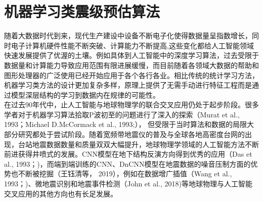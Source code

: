 
\chapter{机器学习类震级预估算法}
\indent 随着大数据时代到来，现代生产建设中设备不断电子化使得数据量呈指数增长，同时电子计算机硬件性能不断突破、计算能力不断提高,这些变化都给人工智能领域快速发展提供了优渥的土壤。例如具体到人工智能中的深度学习算法，过去受限于数据量和计算能力导致应用范围有限进展缓慢，而目前随着各领域大数据的帮助和图形处理器的广泛使用已经开始应用于各个各行各业。相比传统的统计学习方法，机器学习类方法的设计更加复杂多样，原理上提供了无需手动进行特征工程而是通过模型深层结构的学习到数据内在规律的可能性。\\
\indent 在过去90年代中，止人工智能与地球物理学的联合交叉应用仍处于起步阶段。很多学者对于机器学习算法拾取P波初至的问题进行了深入的探索（Murat et al., 1993；Michael D.McCormack et al., 1993;）， 但受限于当时算法和数据的局限大部分研究都处于尝试阶段。随着宽频带地震仪的普及与全球各地高密度台网的出现，台站地震数据数量和质量双双大幅提升，地球物理学领域的人工智能方法不断前进获得井喷式的发展。CNN模型在地下结构反演方向得到优秀的应用（Das et al., 1993；)，而端到端训练的CNN、DnCNN模型在地震数据的噪音压制方面的优势也不断被挖掘（王钰清等， 2019），例如在数据增广插值（Wang et al., 1993；)、微地震识别和地震事件检测（John et al., 2018)等地球物理与人工智能交叉应用的其他方向也有长足发展。\\
